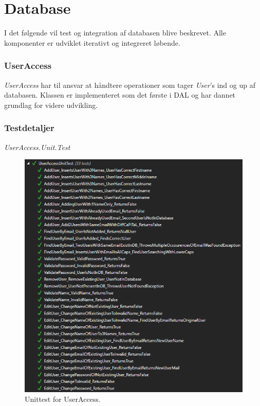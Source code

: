 \section{Database}\label{sec:testdatabase}
I det følgende vil test og integration af databasen blive beskrevet. Alle komponenter er udviklet iterativt og integreret løbende.

\subsubsection{UserAccess}
\textit{UserAccess} har til ansvar at håndtere operationer som tager \textit{User}'s ind og up af databasen. Klassen er implementeret som det første i DAL og har dannet grundlag for videre udvikling.

\subsubsection{Testdetaljer}
\textit{UserAccess.Unit.Test} 

\begin{figure}[H]
\centering
\includegraphics[width=0.9\linewidth]{figs/test/useraccessunittest}
\caption{Unittest for UserAccess.}
\label{fig:useraccessunittest}
\end{figure}


